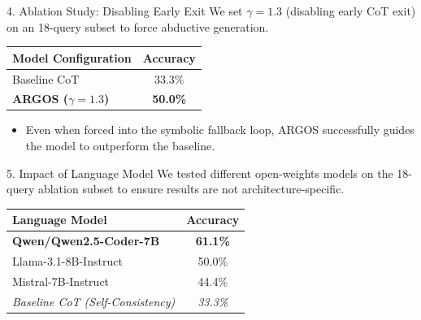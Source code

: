 \documentclass{beamer}
\begin{document}
    \begin{frame}{4. Ablation Study: Disabling Early Exit}
        We set $\gamma=1.3$ (disabling early CoT exit) on an 18-query subset to force abductive generation.
        \vspace{0.5cm}
        \begin{table}
            \centering
            \begin{tabular}{lc}
                \toprule
                \textbf{Model Configuration} & \textbf{Accuracy} \\
                \midrule
                Baseline CoT & 33.3\% \\
                \textbf{ARGOS ($\gamma=1.3$)} & \textbf{50.0\%} \\
                \bottomrule
            \end{tabular}
        \end{table}
        \vspace{0.3cm}
        \begin{itemize}
            \item Even when forced into the symbolic fallback loop, ARGOS successfully guides the model to outperform the baseline.
        \end{itemize}
    \end{frame}

    \begin{frame}{5. Impact of Language Model}
        We tested different open-weights models on the 18-query ablation subset to ensure results are not architecture-specific.
        \vspace{0.2cm}
        \begin{table}
            \centering
            \begin{tabular}{lc}
                \toprule
                \textbf{Language Model} & \textbf{Accuracy} \\
                \midrule
                \textbf{Qwen/Qwen2.5-Coder-7B} & \textbf{61.1\%} \\
                Llama-3.1-8B-Instruct & 50.0\% \\
                Mistral-7B-Instruct & 44.4\% \\
                \midrule
                \textit{Baseline CoT (Self-Consistency)} & \textit{33.3\%} \\
                \bottomrule
            \end{tabular}
        \end{table}
    \end{frame}
\end{document}
